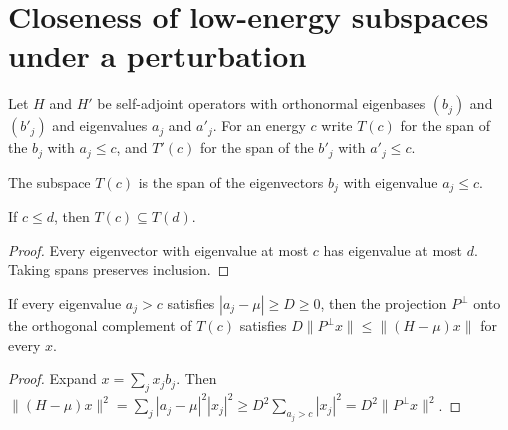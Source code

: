 \section{Closeness of low-energy subspaces under a perturbation}

Let $H$ and $H'$ be self-adjoint operators with orthonormal eigenbases
$(b_j)$ and $(b'_j)$ and eigenvalues $a_j$ and $a'_j$. For an energy $c$
write $T(c)$ for the span of the $b_j$ with $a_j\le c$, and $T'(c)$ for the
span of the $b'_j$ with $a'_j\le c$.

\begin{definition}
    \label{def:spectral_span_le}
    \leanok
    The subspace $T(c)$ is the span of the eigenvectors $b_j$ with
    eigenvalue $a_j\le c$.
\end{definition}

\begin{theorem}
    \label{thm:spectral_span_cutoff_order}
    \leanok
    If $c\le d$, then $T(c)\subseteq T(d)$.
\end{theorem}
\begin{proof}
    \leanok
    Every eigenvector with eigenvalue at most $c$ has eigenvalue at
    most $d$. Taking spans preserves inclusion.
\end{proof}

\begin{theorem}
    \label{thm:spectral_span_markov}
    \leanok
    If every eigenvalue $a_j>c$ satisfies $|a_j-\mu|\ge D\ge0$, then the
    projection $P^\perp$ onto the orthogonal complement of $T(c)$ satisfies
    $D\|P^\perp x\|\le\|(H-\mu)x\|$ for every $x$.
\end{theorem}

\begin{proof}
    \leanok
    Expand $x=\sum_jx_jb_j$. Then
    $\|(H-\mu)x\|^2=\sum_j|a_j-\mu|^2|x_j|^2\ge D^2\sum_{a_j>c}|x_j|^2
        =D^2\|P^\perp x\|^2$.
\end{proof}

